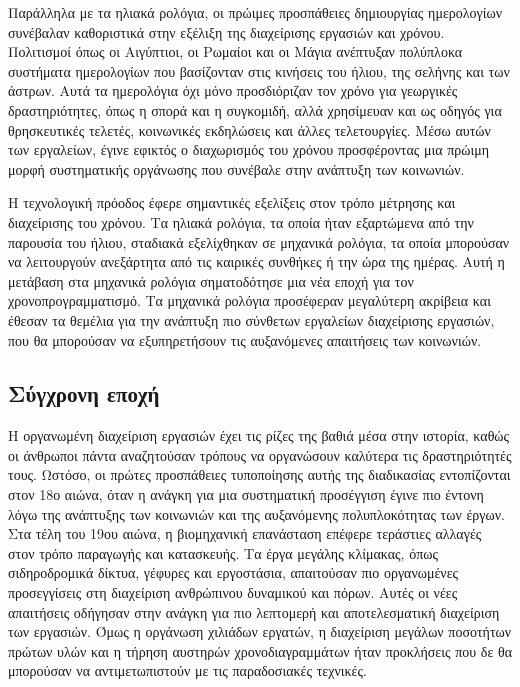             Παράλληλα με τα ηλιακά ρολόγια, οι πρώιμες προσπάθειες δημιουργίας ημερολογίων συνέβαλαν καθοριστικά στην εξέλιξη της διαχείρισης εργασιών και χρόνου. Πολιτισμοί όπως οι Αιγύπτιοι, οι Ρωμαίοι και οι Μάγια ανέπτυξαν πολύπλοκα συστήματα ημερολογίων που βασίζονταν στις κινήσεις του ήλιου, της σελήνης και των άστρων. Αυτά τα ημερολόγια όχι μόνο προσδιόριζαν τον χρόνο για γεωργικές δραστηριότητες, όπως η σπορά και η συγκομιδή, αλλά χρησίμευαν και ως οδηγός για θρησκευτικές τελετές, κοινωνικές εκδηλώσεις και άλλες τελετουργίες. Μέσω αυτών των εργαλείων, έγινε εφικτός ο διαχωρισμός του χρόνου προσφέροντας μια πρώιμη μορφή συστηματικής οργάνωσης που συνέβαλε στην ανάπτυξη των κοινωνιών. \cite{Richards_2000}

            Η τεχνολογική πρόοδος έφερε σημαντικές εξελίξεις στον τρόπο μέτρησης και διαχείρισης του χρόνου. Τα ηλιακά ρολόγια, τα οποία ήταν εξαρτώμενα από την παρουσία του ήλιου, σταδιακά εξελίχθηκαν σε μηχανικά ρολόγια, τα οποία μπορούσαν να λειτουργούν ανεξάρτητα από τις καιρικές συνθήκες ή την ώρα της ημέρας. Αυτή η μετάβαση στα μηχανικά ρολόγια σηματοδότησε μια νέα εποχή για τον χρονοπρογραμματισμό. Τα μηχανικά ρολόγια προσέφεραν μεγαλύτερη ακρίβεια και έθεσαν τα θεμέλια για την ανάπτυξη πιο σύνθετων εργαλείων διαχείρισης εργασιών, που θα μπορούσαν να εξυπηρετήσουν τις αυξανόμενες απαιτήσεις των κοινωνιών.

        \subsection{Σύγχρονη εποχή}
            Η οργανωμένη διαχείριση εργασιών έχει τις ρίζες της βαθιά μέσα στην ιστορία, καθώς οι άνθρωποι πάντα αναζητούσαν τρόπους να οργανώσουν καλύτερα τις δραστηριότητές τους. Ωστόσο, οι πρώτες προσπάθειες τυποποίησης αυτής της διαδικασίας εντοπίζονται στον 18ο αιώνα, όταν η ανάγκη για μια συστηματική προσέγγιση έγινε πιο έντονη λόγω της ανάπτυξης των κοινωνιών και της αυξανόμενης πολυπλοκότητας των έργων. Στα τέλη του 19ου αιώνα, η βιομηχανική επανάσταση επέφερε τεράστιες αλλαγές στον τρόπο παραγωγής και κατασκευής. Τα έργα μεγάλης κλίμακας, όπως σιδηροδρομικά δίκτυα, γέφυρες και εργοστάσια, απαιτούσαν πιο οργανωμένες προσεγγίσεις στη διαχείριση ανθρώπινου δυναμικού και πόρων. Αυτές οι νέες απαιτήσεις οδήγησαν στην ανάγκη για πιο λεπτομερή και αποτελεσματική διαχείριση των εργασιών. Όμως η οργάνωση χιλιάδων εργατών, η διαχείριση μεγάλων ποσοτήτων πρώτων υλών και η τήρηση αυστηρών χρονοδιαγραμμάτων ήταν προκλήσεις που δε θα μπορούσαν να αντιμετωπιστούν με τις παραδοσιακές τεχνικές.

